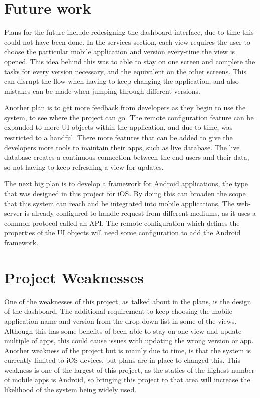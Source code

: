 \section{Future work}

Plans for the future include redesigning the dashboard interface, due to time this could not have been done. In the services section, each view requires the user to choose the particular mobile application and version every-time the view is opened. This idea behind this was to able to stay on one screen and complete the tasks for every version necessary, and the equivalent on the other screens. This can disrupt the flow when having to keep changing the application, and also mistakes can be made when jumping through different versions.

Another plan is to get more feedback from developers as they begin to use the system, to see where the project can go. The remote configuration feature can be expanded to more UI objects within the application, and due to time, was restricted to a handful. There more features that can be added to give the developers more tools to maintain their apps, such as live database. The live database creates a continuous connection between the end users and their data, so not having to keep refreshing a view for updates.


The next big plan is to develop a framework for Android applications, the type that was designed in this project for iOS. By doing this can broaden the scope that this system can reach and be integrated into mobile applications. The web-server is already configured to handle request from different mediums, as it uses a common protocol called an API. The remote configuration which defines the properties of the UI objects will need some configuration to add the Android framework.

\section{Project Weaknesses}

One of the weaknesses of this project, as talked about in the plans, is the design of the dashboard. The additional requirement to keep choosing the mobile application name and version from the drop-down list in some of the views. Although this has some benefits of been able to stay on one view and update multiple of apps, this could cause issues with updating the wrong version or app. Another weakness of the project but is mainly due to time, is that the system is currently limited to iOS devices, but plans are in place to changed this. This weakness is one of the largest of this project, as the statics of the highest number of mobile apps is Android, so bringing this project to that area will increase the likelihood of the system being widely used.

